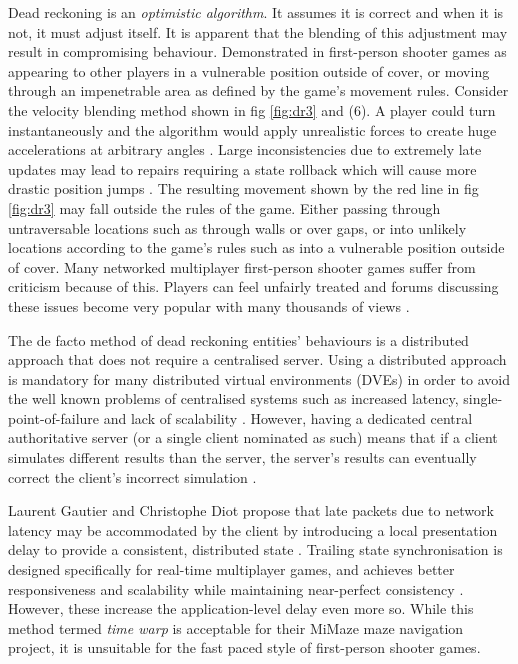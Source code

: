 \documentclass[journal]{IEEEtran}
\begin{document}
Dead reckoning is an \textit{optimistic algorithm}. It assumes it is correct  and when it is not, it must adjust itself. It is apparent that the blending of this adjustment may result in compromising behaviour. Demonstrated in first-person shooter games as appearing to other players in a vulnerable position outside of cover, or moving through an impenetrable area as defined by the game's movement rules. Consider the velocity blending method shown in fig \ref{fig:dr3} and (6). A player could turn instantaneously and the algorithm would apply unrealistic forces to create huge accelerations at arbitrary angles \cite{bernier2001latency}. Large inconsistencies due to extremely late updates may lead to repairs requiring a state rollback which will cause more drastic position jumps \cite{cronin2002efficient}. The resulting movement shown by the red line in fig \ref{fig:dr3} may fall outside the rules of the game. Either passing through untraversable locations such as through walls or over gaps, or into unlikely locations according to the game's rules such as into a vulnerable position outside of cover. Many networked multiplayer first-person shooter games suffer from criticism because of this. Players can feel unfairly treated and forums discussing these issues become very popular with many thousands of views \cite{rout2013youtube} \cite{gkac2014gamefaqs} \cite{drift0r2013youtube} \cite{solaire2016reddit} \cite{ss2018reddit} \cite{hp2015bungie}.

The de facto method of dead reckoning entities' behaviours is a distributed approach that does not require a centralised server. Using a distributed approach is mandatory for many distributed virtual environments (DVEs) in order to avoid the well known problems of centralised systems such as increased latency, single-point-of-failure and lack of scalability \cite{mauve2000keep}. However, having a dedicated central authoritative server (or a single client nominated as such) means that if a client simulates different results than the server, the server’s results can eventually correct the client’s incorrect simulation \cite{bernier2001latency}.

Laurent Gautier and Christophe Diot propose that late packets due to network latency may be accommodated by the client by introducing a local presentation delay to provide a consistent, distributed state \cite{gautier1998design}. Trailing state synchronisation is designed specifically for real-time multiplayer games, and achieves better responsiveness and scalability while maintaining near-perfect consistency \cite{cronin2001distributed}. However, these increase the application-level delay even more so. While this method termed \textit{time warp} is acceptable for their MiMaze maze navigation project, it is unsuitable for the fast paced style of first-person shooter games.
\end{document}
